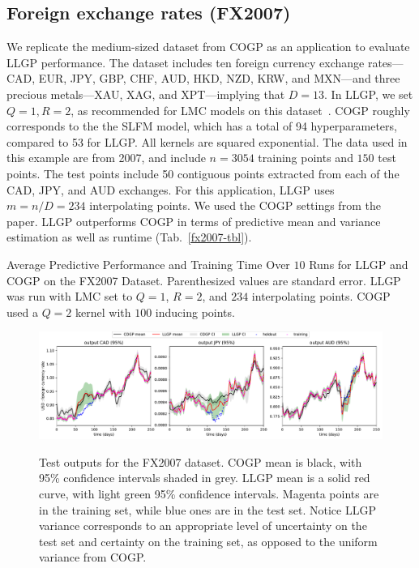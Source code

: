 \documentclass[twoside]{article}
\begin{document}
\subsection{Foreign exchange rates (FX2007)}\label{fx2007-results}

We replicate the medium-sized dataset from COGP as an application to evaluate LLGP performance. The dataset includes ten foreign currency exchange rates---CAD, EUR, JPY, GBP, CHF, AUD, HKD, NZD, KRW, and MXN---and three precious metals---XAU, XAG, and XPT---implying that $D=13$. In LLGP, we set $Q=1,R=2$, as recommended for LMC models on this dataset~\citep{alvarez2010efficient}. COGP roughly corresponds to the the SLFM model, which has a total of 94 hyperparameters, compared to 53 for LLGP. All kernels are squared exponential. The data used in this example are from 2007, and include $n=3054$ training points and $150$ test points. The test points include 50 contiguous points extracted from each of the CAD, JPY, and AUD exchanges. For this application, LLGP uses $m=n/D=234$ interpolating points. We used the COGP settings from the paper. LLGP outperforms COGP in terms of predictive mean and variance estimation as well as runtime (Tab.~\ref{fx2007-tbl}).

\begin{table}[!ht]
  \caption{Average Predictive Performance and Training Time Over $10$ Runs for LLGP and COGP on the FX2007 Dataset. Parenthesized values are standard error. LLGP was run with LMC set to $Q=1$, $R=2$, and $234$ interpolating points. COGP used a $Q=2$ kernel with $100$ inducing points.}
\label{fx2007-tbl}
\begin{center}
  \begin{small}
    \begin{sc}
      
\end{sc}
\end{small}
\end{center}
\end{table}

\begin{figure}[!ht]
\centering
{\includegraphics[width=\textwidth]{fx2007graph.pdf}}
\caption{Test outputs for the FX2007 dataset. COGP mean is black, with 95\% confidence intervals shaded in grey. LLGP mean is a solid red curve, with light green 95\% confidence intervals. Magenta points are in the training set, while blue ones are in the test set. Notice LLGP variance corresponds to an appropriate level of uncertainty on the test set and certainty on the training set, as opposed to the uniform variance from COGP.}
\label{fx2007-graph}
\end{figure}
\end{document}
